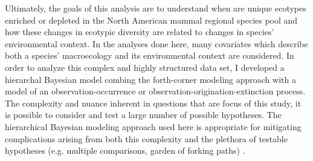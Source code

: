 \documentclass[12pt,letterpaper]{article}
\begin{document}
Ultimately, the goals of this analysis are to understand when are unique ecotypes enriched or depleted in the North American mammal regional species pool and how these changes in ecotypic diversity are related to changes in species' environmental context. In the analyses done here, many covariates which describe both a species' macroecology and its environmental context are considered. In order to analyze this complex and highly structured data set, I developed a hierarchal Bayesian model combing the forth-corner modeling approach with a model of an observation-occurrence or observation-origination-extinction process. The complexity and nuance inherent in questions that are focus of this study, it is possible to consider and test a large number of possible hypotheses. The hierarchical Bayesian modeling approach used here is appropriate for mitigating complications arising from both this complexity and the plethora of testable hypotheses (e.g. multiple comparisons, garden of forking paths) \citep{Gelman2013d,Gelman2012a,Gelman2014}.
\end{document}
